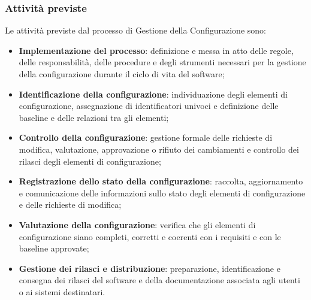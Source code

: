 \documentclass[a4paper,12pt]{article}
\begin{document}
        \subsubsection{Attività previste}
            Le attività previste dal processo di Gestione della Configurazione sono:
            \begin{itemize}
                \item \textbf{Implementazione del processo}: definizione e messa in atto delle regole, delle responsabilità, delle procedure e degli strumenti necessari per la gestione della configurazione durante il ciclo di vita del software;
                \item \textbf{Identificazione della configurazione}: individuazione degli elementi di configurazione, assegnazione di identificatori univoci e definizione delle baseline e delle relazioni tra gli elementi;
                \item \textbf{Controllo della configurazione}: gestione formale delle richieste di modifica, valutazione, approvazione o rifiuto dei cambiamenti e controllo dei rilasci degli elementi di configurazione;
                \item \textbf{Registrazione dello stato della configurazione}: raccolta, aggiornamento e comunicazione delle informazioni sullo stato degli elementi di configurazione e delle richieste di modifica;
                \item \textbf{Valutazione della configurazione}: verifica che gli elementi di configurazione siano completi, corretti e coerenti con i requisiti e con le baseline approvate;
                \item \textbf{Gestione dei rilasci e distribuzione}: preparazione, identificazione e consegna dei rilasci del software e della documentazione associata agli utenti o ai sistemi destinatari.
            \end{itemize}
\end{document}
